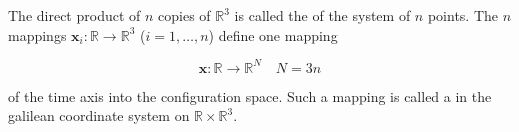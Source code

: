 The direct product of $n$ copies of $\mathbb{R}^3$ is called the  of the system of $n$ points. The $n$ mappings $\mathbf{x}_i: \mathbb{R} \rightarrow \mathbb{R}^3$ ($i = 1, \ldots, n$) define one mapping

$$\mathbf{x}: \mathbb{R} \rightarrow \mathbb{R}^N \quad N = 3n$$

of the time axis into the configuration space. Such a mapping is called a  in the galilean coordinate system on $\mathbb{R} \times \mathbb{R}^3$.
